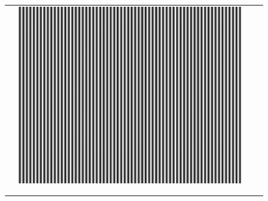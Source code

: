 \begin{figure}[H]
\begin{tabularx}{\textwidth}{p{}CCC}
\begin{minipage}{.25\textwidth}
        \end{minipage} &
        \begin{minipage}{.25\textwidth}
            \centering
            \includegraphics[width=\textwidth,keepaspectratio]{../../Figures/08_13_img64.pdf}
        \end{minipage}                                  \\
        \vspace{.5em}                                                                                                     \\
        \begin{minipage}{.05\textwidth}
            \centering
        \end{minipage}                                               &
        \begin{minipage}{.25\textwidth}
            \centering
        \end{minipage}                                        &
        \begin{minipage}{.25\textwidth}
        \end{minipage}                                       &
        \begin{minipage}{.25\textwidth}
        \end{minipage}                                                                        \\

\end{tabularx}
\end{figure}
